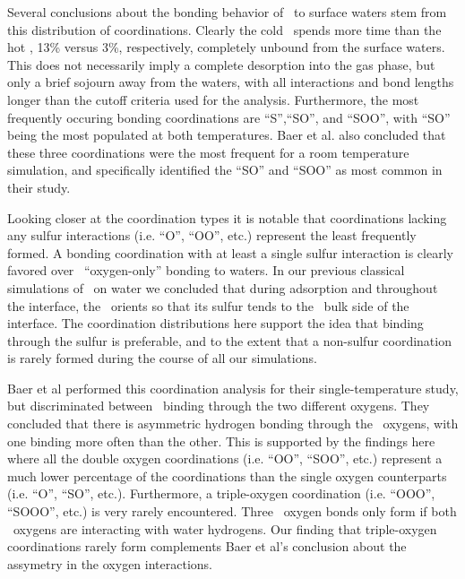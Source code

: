 	Several conclusions about the bonding behavior of \suldiox~to surface waters stem from this distribution of coordinations. Clearly the cold \suldiox~spends more time than the hot \suldiox, 13\% versus 3\%, respectively, completely unbound from the surface waters. This does not necessarily imply a complete desorption into the gas phase, but only a brief sojourn away from the waters, with all interactions and bond lengths longer than the cutoff criteria used for the analysis. Furthermore, the most frequently occuring bonding coordinations are ``S'',``SO'', and ``SOO'', with ``SO'' being the most populated at both temperatures. Baer et al. also concluded that these three coordinations were the most frequent for a room temperature simulation, and specifically identified the ``SO'' and ``SOO'' as most common in their study.\cite{Baer2010}

	Looking closer at the coordination types it is notable that coordinations lacking any sulfur interactions (i.e. ``O'', ``OO'', etc.) represent the least frequently formed. A bonding coordination with at least a single sulfur interaction is clearly favored over \suldiox~``oxygen-only'' bonding to waters. In our previous classical simulations of \suldiox~on water we concluded that during adsorption and throughout the interface, the \suldiox~orients so that its sulfur tends to the \wat~bulk side of the interface.\cite{Shamay2011} The coordination distributions here support the idea that binding through the sulfur is preferable, and to the extent that a non-sulfur coordination is rarely formed during the course of all our simulations.

Baer et al performed this coordination analysis for their single-temperature study, but discriminated between \suldiox~binding through the two different oxygens. They concluded that there is asymmetric hydrogen bonding through the \suldiox~oxygens, with one binding more often than the other. This is supported by the findings here where all the double oxygen coordinations (i.e. ``OO'', ``SOO'', etc.) represent a much lower percentage of the coordinations than the single oxygen counterparts (i.e. ``O'', ``SO'', etc.). Furthermore, a triple-oxygen coordination (i.e. ``OOO'', ``SOOO'', etc.) is very rarely encountered. Three \suldiox~oxygen bonds only form if both \suldiox~oxygens are interacting with water hydrogens. Our finding that triple-oxygen coordinations rarely form complements Baer et al's conclusion about the assymetry in the oxygen interactions.

